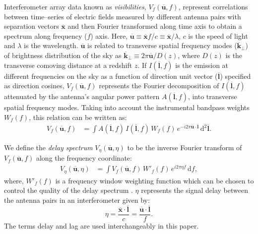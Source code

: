 \documentclass[preprint2,iop,numberedappendix]{emulateapj}
\newcommand{\dif}{\mathrm{d}}
\begin{document}
Interferometer array data known as {\it visibilities}, $V_f(\overline{\mathbf{u}},f)$, represent correlations between time--series of electric fields measured by different antenna pairs with separation vectors $\overline{\mathbf{x}}$ and then Fourier transformed along time axis to obtain a spectrum along frequency ($f$) axis. Here, $\overline{\mathbf{u}}\equiv \overline{\mathbf{x}}f/c \equiv \overline{\mathbf{x}}/\lambda$, $c$ is the speed of light and $\lambda$ is the wavelength. $\overline{\mathbf{u}}$ is related to transverse spatial frequency modes ($\overline{\mathbf{k}}_\perp$) of brightness distribution of the sky as $\overline{\mathbf{k}}_\perp \equiv 2\pi\overline{\mathbf{u}}/D(z)$, where $D(z)$ is the transverse comoving distance at a redshift $z$. If $I(\overline{\mathbf{l}},f)$ is the emission at different frequencies on the sky as a function of direction unit vector ($\overline{\mathbf{l}}$) specified as direction cosines, $V_f(\overline{\mathbf{u}},f)$ represents the Fourier decomposition of $I(\overline{\mathbf{l}},f)$ attenuated by the antenna's angular power pattern $A(\overline{\mathbf{l}},f)$, into transverse spatial frequency modes. Taking into account the instrumental bandpass weights $W_f(f)$, this relation can be written as:
\begin{align}\label{eqn:obsvis}
  V_f(\overline{\mathbf{u}},f) &= \int A(\overline{\mathbf{l}},f)\,I(\overline{\mathbf{l}},f)\,W_f(f)\,e^{-i2\pi \overline{\mathbf{u}}\cdot\overline{\mathbf{l}}}\,\dif^2 \overline{\mathbf{l}}.
\end{align}

We define the {\it delay spectrum} $V_\eta(\overline{\mathbf{u}},\eta)$ to be the inverse Fourier transform of $V_f(\overline{\mathbf{u}},f)$ along the frequency coordinate:
\begin{align}\label{eqn:delay-transform}
  V_\eta(\overline{\mathbf{u}},\eta) &= \int V_f(\overline{\mathbf{u}},f)\,W'_f(f)\,e^{i2\pi\eta f}\,\dif f,
\end{align}
where, $W'_f(f)$ is a frequency window weighting function which can be chosen to control the quality of the delay spectrum \citep{thy13,ved12}. $\eta$ represents the signal delay between the antenna pairs in an interferometer given by:
\begin{equation}\label{eqn:delay}
  \eta = \frac{\overline{\mathbf{x}}\cdot\overline{\mathbf{l}}}{c} = \frac{\overline{\mathbf{u}}\cdot\overline{\mathbf{l}}}{f}.
\end{equation}
The terms delay and lag are used interchangeably in this paper.
\end{document}
